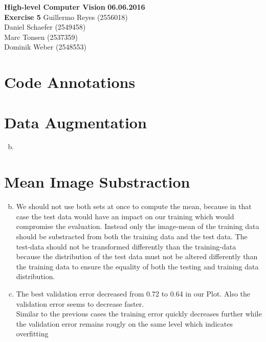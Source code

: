 \documentclass[12pt]{article}
\begin{document}

\noindent
{\Large \textbf{High-level Computer Vision}} \hfill \textbf{06.06.2016}\\
{\Large \textbf{Exercise 5}} 
\raggedleft \hfill Guillermo Reyes (2556018)\\
\hfill Daniel Schaefer (2549458)\\
\hfill Marc Tonsen (2537359)\\
\hfill Dominik Weber (2548553)\\

\raggedright


\section*{Code Annotations}




\section{Data Augmentation}

\begin{enumerate}[a)]
        \setcounter{enumi}{1}
    \item 
\end{enumerate}


\section{Mean Image Substraction}

\begin{enumerate}[a)]
        \setcounter{enumi}{1}
    \item 
        We should not use both sets at once to compute the mean, because in that case the test data would have an impact on our training which would compromise the evaluation. Instead only the image-mean of the training data should be substracted from both the training data and the test data. The test-data should not be transformed differently than the training-data because the distribution of the test data must not be altered differently than the training data to ensure the equality of both the testing and training data distribution. 
    \item
        The best validation error decreased from 0.72 to 0.64 in our Plot. %
        Also the validation error seems to decrease faster.\\
        Similar to the previous cases the training error quickly decreases further while the validation error remains rougly on the same level which indicates overfitting
\end{enumerate}
\end{document}
